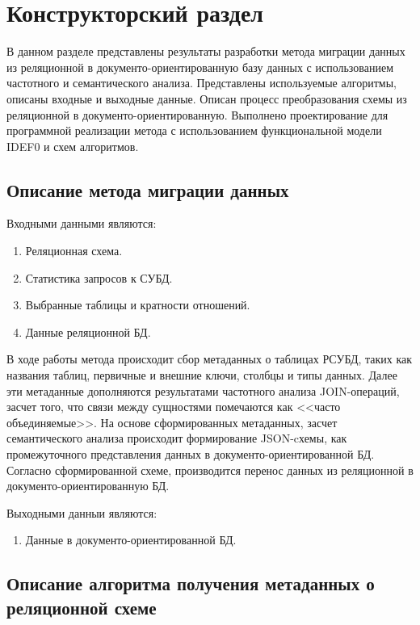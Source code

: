 \chapter{Конструкторский раздел}
В данном разделе представлены результаты разработки метода миграции данных 
из реляционной в документо-ориентированную базу данных 
с использованием частотного и семантического анализа.
Представлены используемые алгоритмы, описаны входные и выходные данные.
Описан процесс преобразования схемы из реляционной в документо-ориентированную.
Выполнено проектирование для программной реализации метода с
использованием функциональной модели IDEF0 и схем алгоритмов.

\section{Описание метода миграции данных}
Входными данными являются:
\begin{enumerate}
    \item Реляционная схема.
    \item Статистика запросов к СУБД.
    \item Выбранные таблицы и кратности отношений.
    \item Данные реляционной БД.
\end{enumerate}

В ходе работы метода происходит сбор метаданных о таблицах РСУБД, 
таких как названия таблиц, первичные и внешние ключи, столбцы и типы данных.
Далее эти метаданные дополняются результатами частотного анализа JOIN-операций, 
засчет того, что связи между сущностями помечаются как <<часто объединяемые>>. 
На основе сформированных метаданных, 
засчет семантического анализа происходит формирование JSON-cхемы, 
как промежуточного представления данных в документо-ориентированной БД.
Согласно сформированной схеме, производится перенос данных из реляционной в документо-ориентированную БД.

Выходными данныи являются:
\begin{enumerate}
    \item Данные в документо-ориентированной БД.
\end{enumerate}
\clearpage



\section{Описание алгоритма получения метаданных о реляционной схеме}


